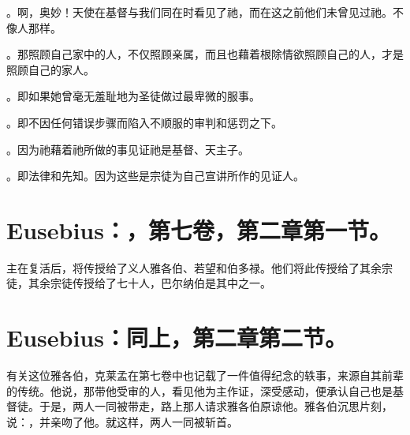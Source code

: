 。啊，奥妙！天使在基督与我们同在时看见了祂，而在这之前他们未曾见过祂。不像人那样。\par

。那照顾自己家中的人，不仅照顾亲属，而且也藉着根除情欲照顾自己的人，才是照顾自己的家人。\par

。即如果她曾毫无羞耻地为圣徒做过最卑微的服事。\par

。即不因任何错误步骤而陷入不顺服的审判和惩罚之下。\par

。因为祂藉着祂所做的事见证祂是基督、天主子。\par

。即法律和先知。因为这些是宗徒为自己宣讲所作的见证人。\par


\section{Eusebius：，第七卷，第二章第一节。}

主在复活后，将传授给了义人雅各伯、若望和伯多禄。他们将此传授给了其余宗徒，其余宗徒传授给了七十人，巴尔纳伯是其中之一。\par


\section{Eusebius：同上，第二章第二节。}

有关这位雅各伯，克莱孟在第七卷中也记载了一件值得纪念的轶事，来源自其前辈的传统。他说，那带他受审的人，看见他为主作证，深受感动，便承认自己也是基督徒。于是，两人一同被带走，路上那人请求雅各伯原谅他。雅各伯沉思片刻，说：，并亲吻了他。就这样，两人一同被斩首。\par


